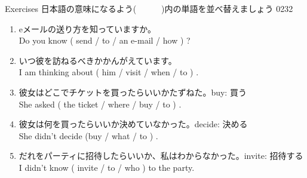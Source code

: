 \documentclass[aspectratio=169,xcolor={dvipsnames,table}]{beamer}
\begin{document}
\begin{frame}[plain]{Exercises}
日本語の意味になるよう(~~~~~~)内の単語を並べ替えましょう%
\hfill{\tiny 0232}\,{\scriptsize {}}

 \begin{enumerate}
  \item eメールの送り方を知っていますか。\\%
	Do you know ( send / to / an e-mail / how ) ?\hfill{}
	\visible<2->{\textcolor{BurntOrange}{\bfseries how to send an e-mail}}
  \item いつ彼を訪ねるべきかかんがえています。\\
	I am thinking about ( him / visit / when / to ) .\hfill{}
	\visible<3->{\textcolor{BurntOrange}{\bfseries when to visit him}}
  \item 彼女はどこでチケットを買ったらいいかたずねた。\hfill{\scriptsize buy: 買う}\\
	She asked ( the ticket / where / buy / to  ) .\hfill{}
	\\
  \item 彼女は何を買ったらいいか決めていなかった。\hfill{\scriptsize decide: 決める}\\
	She didn't decide (buy / what / to ) .
	\hfill\visible<5->{\textcolor{BurntOrange}{\bfseries what to buy}}
  \item だれをパーティに招待したらいいか、私はわからなかった。\hfill{\scriptsize invite: 招待する}\\
	I didn't know ( invite / to / who ) to the party.\hfill{}
	\visible<6->{\textcolor{BurntOrange}{\bfseries who to invite}}
 \end{enumerate}
\end{frame}
\end{document}
